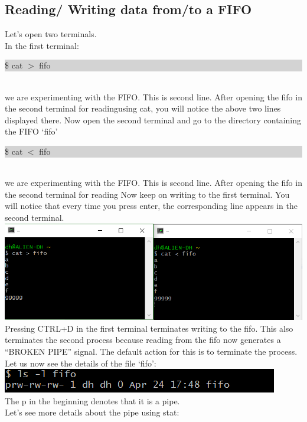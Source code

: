 \documentclass[10pt,preprint]{sigplanconf}
\begin{document}
\subsection{Reading/ Writing data from/to a FIFO}
Let’s open two terminals.\\
In the first terminal:\\
\colorbox{lightgray}{\begin{minipage}{8cm}
\$ cat $>$ fifo
\end{minipage}}\\
we are experimenting with the FIFO. This is second line. After opening the fifo in the second terminal for readingusing cat, you will notice the above two lines displayed there.
Now open the second terminal and go to the directory containing the FIFO ‘fifo’\\
\colorbox{lightgray}{\begin{minipage}{8cm}
\$ cat $<$ fifo
\end{minipage}}\\
we are experimenting with the FIFO. This is second line. After opening the fifo in the second terminal for reading
Now keep on writing to the first terminal. You will notice that every time you press enter, the corresponding line appears in the second terminal.\\
\includegraphics[totalheight=27mm]{fig1.png}
Pressing CTRL+D in the first terminal terminates writing to the fifo. This also terminates the second process because reading from the fifo now generates a “BROKEN PIPE” signal. The default action for this is to terminate the process.\\
Let us now see the details of the file ‘fifo’:\\
\includegraphics[totalheight=7mm]{fig2.png}\\
The p in the beginning denotes that it is a pipe.\\
Let’s see more details about the pipe using stat:\\
\end{document}

